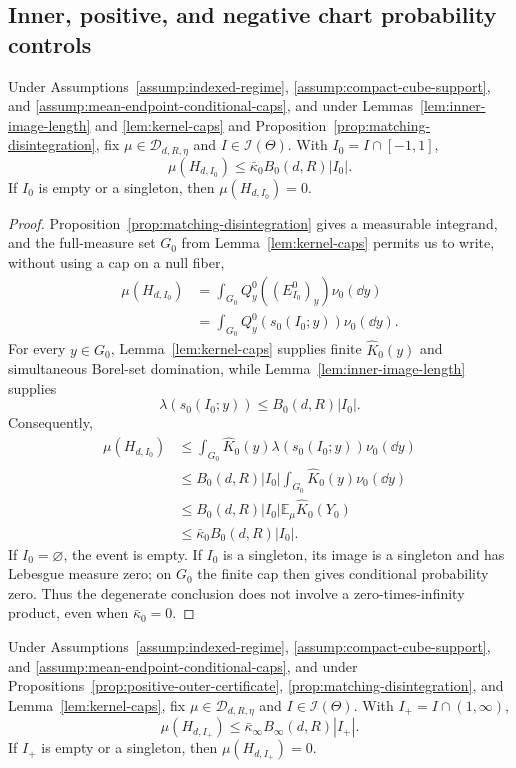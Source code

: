 \subsection{Inner, positive, and negative chart probability controls}
\label{app:chart-probabilities}

\begin{proposition}
\label{prop:inner-chart-probability}
Under Assumptions~\ref{assump:indexed-regime},
\ref{assump:compact-cube-support}, and
\ref{assump:mean-endpoint-conditional-caps}, and under
Lemmas~\ref{lem:inner-image-length} and \ref{lem:kernel-caps} and
Proposition~\ref{prop:matching-disintegration}, fix
$\mu\in\mathcal D_{d,R,\eta}$ and $I\in\mathcal I(\Theta)$.  With
$I_0=I\cap[-1,1]$,
\[
\mu(H_{d,I_0})\leq\bar\kappa_0B_0(d,R)|I_0|.
\]
If $I_0$ is empty or a singleton, then $\mu(H_{d,I_0})=0$.
\end{proposition}

\begin{proof}
Proposition~\ref{prop:matching-disintegration} gives a measurable integrand,
and the full-measure set $G_0$ from Lemma~\ref{lem:kernel-caps} permits us to
write, without using a cap on a null fiber,
\[
\begin{aligned}
\mu(H_{d,I_0})
&=\int_{G_0}Q^0_y((E^0_{I_0})_y)\nu_0(\dd y)\\
&=\int_{G_0}Q^0_y(s_0(I_0;y))\nu_0(\dd y).
\end{aligned}
\]
For every $y\in G_0$, Lemma~\ref{lem:kernel-caps} supplies finite
$\widehat K_0(y)$ and simultaneous Borel-set domination, while
Lemma~\ref{lem:inner-image-length} supplies
\[
\lambda(s_0(I_0;y))\leq B_0(d,R)|I_0|.
\]
Consequently,
\[
\begin{aligned}
\mu(H_{d,I_0})
&\leq\int_{G_0}\widehat K_0(y)\lambda(s_0(I_0;y))\nu_0(\dd y)\\
&\leq B_0(d,R)|I_0|\int_{G_0}\widehat K_0(y)\nu_0(\dd y)\\
&\leq B_0(d,R)|I_0|\mathbb E_\mu\widehat K_0(Y_0)\\
&\leq\bar\kappa_0B_0(d,R)|I_0|.
\end{aligned}
\]
If $I_0=\varnothing$, the event is empty.  If $I_0$ is a singleton, its
image is a singleton and has Lebesgue measure zero; on $G_0$ the finite cap
then gives conditional probability zero.  Thus the degenerate conclusion
does not involve a zero-times-infinity product, even when
$\bar\kappa_0=0$.
\end{proof}

\begin{proposition}
\label{prop:positive-chart-probability}
Under Assumptions~\ref{assump:indexed-regime},
\ref{assump:compact-cube-support}, and
\ref{assump:mean-endpoint-conditional-caps}, and under
Propositions~\ref{prop:positive-outer-certificate},
\ref{prop:matching-disintegration}, and Lemma~\ref{lem:kernel-caps}, fix
$\mu\in\mathcal D_{d,R,\eta}$ and $I\in\mathcal I(\Theta)$.  With
$I_+=I\cap(1,\infty)$,
\[
\mu(H_{d,I_+})\leq\bar\kappa_\infty B_\infty(d,R)|I_+|.
\]
If $I_+$ is empty or a singleton, then $\mu(H_{d,I_+})=0$.
\end{proposition}

